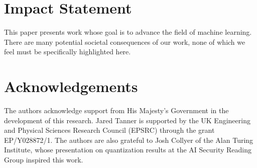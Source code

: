 \documentclass{article}
\theoremstyle{plain}
\theoremstyle{definition}
\theoremstyle{remark}
\begin{document}



\section*{Impact Statement}
This paper presents work whose goal is to advance the field of machine learning. There are many potential societal consequences of our work, none of which we feel must be specifically highlighted here.
\section*{Acknowledgements}
The authors acknowledge support from His Majesty’s Government in the development of this research.
Jared Tanner is supported by the UK Engineering and Physical Sciences Research Council (EPSRC) through the grant EP/Y028872/1.
The authors are also grateful to Josh Collyer of the Alan Turing Institute, whose presentation on quantization results at the AI Security Reading Group  inspired this work.
\end{document}
